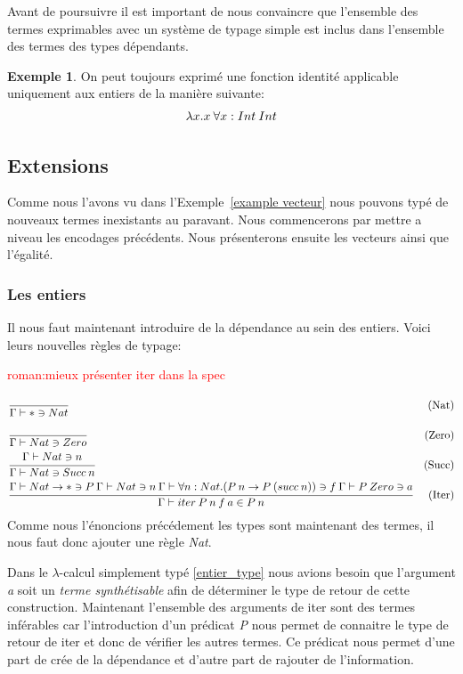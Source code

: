 \documentclass {article}
\theoremstyle{definition}
\newtheorem{example}{Exemple}
\theoremstyle{remark}
\newcommand{\todo}[1]{\textcolor{red}{#1}}
\begin{document}
Avant de poursuivre il est important de nous convaincre que l'ensemble des termes exprimables avec un système 
de typage simple est inclus dans l'ensemble des termes des types dépendants.
\begin{example}
  On peut toujours exprimé une fonction identité applicable uniquement aux entiers de la manière suivante:
  \begin{align*}
    &\lambda x. x\:\forall x:Int\:Int \\
  \end{align*}
\end{example}

\subsection{Extensions}

Comme nous l'avons vu dans l'Exemple~\ref{example vecteur} nous pouvons typé de nouveaux termes inexistants au paravant.
Nous commencerons par mettre a niveau les encodages précédents. Nous présenterons ensuite les vecteurs ainsi que l'égalité.

\subsubsection{Les entiers}

Il nous faut maintenant introduire de la dépendance au sein des entiers. 
Voici leurs nouvelles règles de typage:

\todo{roman:mieux présenter iter dans la spec} 
\begin{align*}
  &\cfrac{}
  {\Gamma\vdash * \ni Nat}&\mbox{(Nat)} \\
  &\cfrac{}
  {\Gamma\vdash Nat \ni Zero}&\mbox{(Zero)} \\
  &\cfrac{\Gamma\vdash Nat \ni n}
  {\Gamma\vdash Nat \ni Succ\:n}&\mbox{(Succ)} \\
  &\cfrac{\Gamma\vdash Nat\rightarrow *\ni P\: \Gamma\vdash Nat\ni n\: \Gamma\vdash \forall n:Nat.(P\:n\rightarrow P\:(succ\:n))\ni f\:
  \Gamma\vdash P\:Zero\ni a}
  {\Gamma\vdash iter \: P\: n\:f\:a\in P\:n}&\mbox{(Iter)}\\
\end{align*}
Comme nous l'énoncions précédement les types sont maintenant des termes, il nous faut donc ajouter une règle \emph{Nat}.

Dans le $\lambda$-calcul simplement typé \ref{entier_type} nous avions besoin que l'argument \emph{a} soit un \emph{terme synthétisable}
afin de déterminer le type de retour de cette construction.
Maintenant l'ensemble des arguments de iter sont des termes inférables car l'introduction d'un prédicat
\emph{P} nous permet de connaitre le type de retour de iter et donc de vérifier les autres termes. 
Ce prédicat nous permet d'une part de crée de la dépendance et d'autre part de rajouter de l'information.
\end{document}
